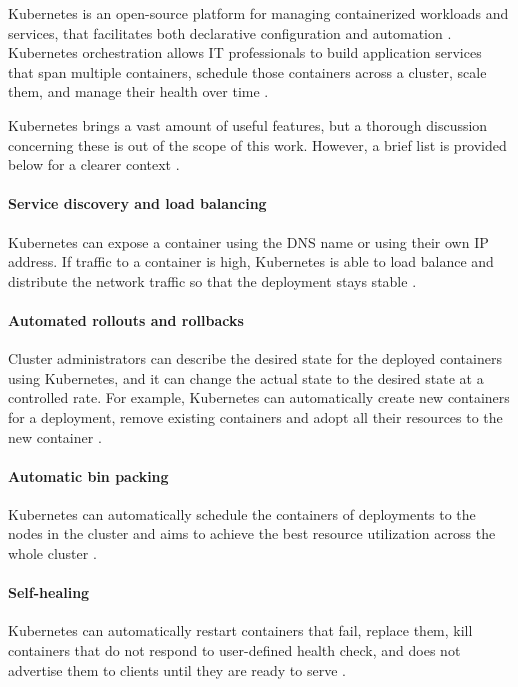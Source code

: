 Kubernetes is an open-source platform for managing containerized workloads and services, that facilitates both declarative configuration and automation \cite{KubernetesOverview}. Kubernetes orchestration allows IT professionals to build application services that span multiple containers, schedule those containers across a cluster, scale them, and manage their health over time \cite{KubernetesOverviewRH}.

Kubernetes brings a vast amount of useful features, but a thorough discussion concerning these is out of the scope of this work. However, a brief list is provided below for a clearer context \cite{KubernetesOverview}.

\paragraph{Service discovery and load balancing} Kubernetes can expose a container using the DNS name or using their own IP address. If traffic to a container is high, Kubernetes is able to load balance and distribute the network traffic so that the deployment stays stable \cite{KubernetesOverview}.

\paragraph{Automated rollouts and rollbacks} Cluster administrators can describe the desired state for the deployed containers using Kubernetes, and it can change the actual state to the desired state at a controlled rate. For example, Kubernetes can automatically create new containers for a deployment, remove existing containers and adopt all their resources to the new container \cite{KubernetesOverview}.

\paragraph{Automatic bin packing} Kubernetes can automatically schedule the containers of deployments to the nodes in the cluster and aims to achieve the best resource utilization across the whole cluster \cite{KubernetesOverview}.

\paragraph{Self-healing} Kubernetes can automatically restart containers that fail, replace them, kill containers that do not respond to user-defined health check, and does not advertise them to clients until they are ready to serve \cite{KubernetesOverview}.


